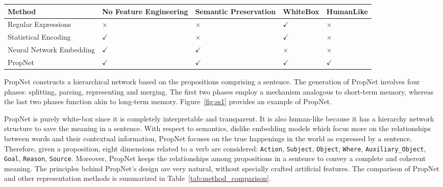 \begin{table*}[h!]
\centering
\begin{tabular}{p{}|p{}|p{}|p{}|p{}}
\hline
\textbf{Method} & \textbf{No Feature Engineering} & \textbf{Semantic Preservation} & \textbf{White\-Box} & \textbf{Human\-Like} \\ \hline
Regular Expressions & $\times$ & $\times$ & $\checkmark$ & $\times$ \\ \hline
Statistical Encoding & $\checkmark$ & $\times$ & $\checkmark$ & $\times$ \\ \hline
Neural Network Embedding & $\checkmark$ & $\checkmark$ & $\times$ & $\times$ \\ \hline
PropNet & $\checkmark$ & $\checkmark$ & $\checkmark$ & $\checkmark$ \\ \hline
\end{tabular}
\caption{Comparison of Sentence Representation Methods}
\label{tab:method_comparison}
\end{table*}

PropNet constructs a hierarchical network based on the
propositions comprising a sentence. The generation of PropNet involves four phases: splitting, parsing, representing and merging. The first two phases employ a mechanism analogous to short-term memory, whereas the last two phases function akin to long-term memory. Figure~\ref{fig:ss1} provides an example of PropNet.



PropNet is purely white-box since it is completely interpretable and transparent. It is also human-like because it has a hierarchy network structure to save the meaning in a sentence. With respect to semantics, dislike embedding models which focus more on the relationships between words and their contextual information, PropNet focuses on the true happenings in the world as expressed by a sentence. Therefore, given a proposition, eight dimensions related to a verb are considered: \texttt{Action}, \texttt{Subject}, \texttt{Object}, \texttt{Where}, \texttt{Auxiliary\_Object}, \texttt{Goal}, \texttt{Reason}, \texttt{Source}. Moreover, PropNet keeps the relationships among propositions in a sentence to convey a complete and coherent meaning. The principles behind PropNet's design are very natural, without specially crafted artificial features. The comparison of PropNet and other representation methods is summarized in Table~\ref{tab:method_comparison}. 

 

